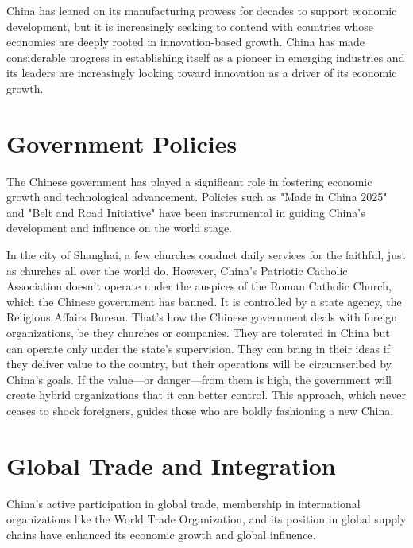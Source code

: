 China has leaned on its manufacturing prowess for decades to 
support economic development, but it is increasingly seeking 
to contend with countries whose economies are deeply rooted in 
innovation-based growth. China has made considerable progress 
in establishing itself as a pioneer in emerging industries and 
its leaders are increasingly looking toward innovation as a 
driver of its economic growth.

\section{Government Policies}

The Chinese government has played a significant role in fostering 
economic growth and technological advancement. Policies such as 
"Made in China 2025" and "Belt and Road Initiative" have been 
instrumental in guiding China's development and influence on the 
world stage.

In the city of Shanghai, a few churches conduct daily services 
for the faithful, just as churches all over the world do. However, 
China's Patriotic Catholic Association doesn't operate under the 
auspices of the Roman Catholic Church, which the Chinese government 
has banned. It is controlled by a state agency, the Religious 
Affairs Bureau. That's how the Chinese government deals with 
foreign organizations, be they churches or companies. They are 
tolerated in China but can operate only under the state's 
supervision. They can bring in their ideas if they deliver 
value to the country, but their operations will be circumscribed 
by China's goals. If the value—or danger—from them is high, the 
government will create hybrid organizations that it can better 
control. This approach, which never ceases to shock foreigners, 
guides those who are boldly fashioning a new China.

\section{Global Trade and Integration}

China's active participation in global trade, membership in 
international organizations like the World Trade Organization, 
and its position in global supply chains have enhanced its economic 
growth and global influence.

